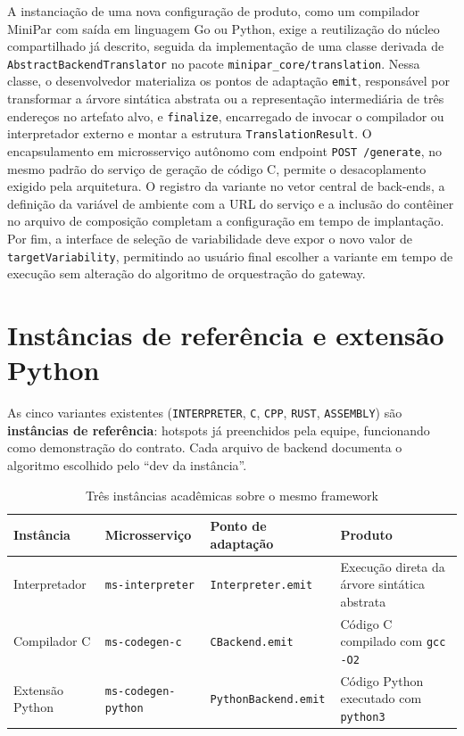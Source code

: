 \documentclass[12pt]{article}
\begin{document}
A instanciação de uma nova configuração de produto, como um compilador MiniPar com saída em linguagem Go ou Python, exige a reutilização do núcleo compartilhado já descrito, seguida da implementação de uma classe derivada de \texttt{AbstractBackendTranslator} no pacote \texttt{minipar\_core/translation}. Nessa classe, o desenvolvedor materializa os pontos de adaptação \texttt{emit}, responsável por transformar a árvore sintática abstrata ou a representação intermediária de três endereços no artefato alvo, e \texttt{finalize}, encarregado de invocar o compilador ou interpretador externo e montar a estrutura \texttt{TranslationResult}. O encapsulamento em microsserviço autônomo com endpoint \texttt{POST /generate}, no mesmo padrão do serviço de geração de código C, permite o desacoplamento exigido pela arquitetura. O registro da variante no vetor central de back-ends, a definição da variável de ambiente com a URL do serviço e a inclusão do contêiner no arquivo de composição completam a configuração em tempo de implantação. Por fim, a interface de seleção de variabilidade deve expor o novo valor de \texttt{targetVariability}, permitindo ao usuário final escolher a variante em tempo de execução sem alteração do algoritmo de orquestração do gateway.

\section{Instâncias de referência e extensão Python}

As cinco variantes existentes (\texttt{INTERPRETER}, \texttt{C}, \texttt{CPP}, \texttt{RUST}, \texttt{ASSEMBLY}) são \textbf{instâncias de referência}: hotspots já preenchidos pela equipe, funcionando como demonstração do contrato. Cada arquivo de backend documenta o algoritmo escolhido pelo ``dev da instância''.

\begin{table}[htbp]
\centering
\small
\caption{Três instâncias acadêmicas sobre o mesmo framework}
\label{tab:reference-instances}
\begin{tabularx}{\textwidth}{|>{\raggedright\arraybackslash}p{2.8cm}|>{\raggedright\arraybackslash}p{2.6cm}|X|>{\raggedright\arraybackslash}p{3.2cm}|}
\hline
\textbf{Instância} & \textbf{Microsserviço} & \textbf{Ponto de adaptação} & \textbf{Produto} \\
\hline
Interpretador & \texttt{ms-interpreter} & \texttt{Interpreter.emit} & Execução direta da árvore sintática abstrata \\
Compilador C & \texttt{ms-codegen-c} & \texttt{CBackend.emit} & Código C compilado com \texttt{gcc -O2} \\
Extensão Python & \texttt{ms-codegen-python} & \texttt{PythonBackend.emit} & Código Python executado com \texttt{python3} \\
\hline
\end{tabularx}
\end{table}
\end{document}
